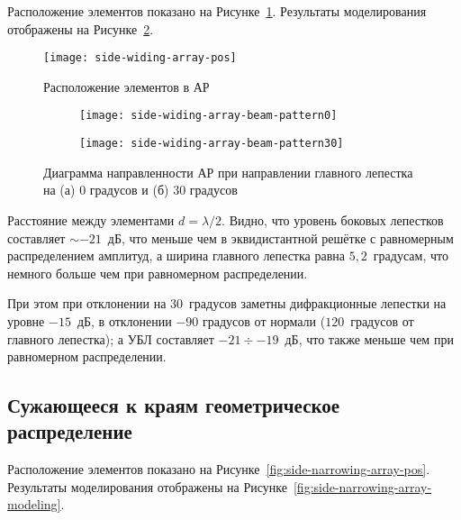 Расположение элементов показано на Рисунке~\ref{fig:side-widing-array-pos}. Результаты моделирования отображены на Рисунке~\ref{fig:side-widing-array-modeling}.

\begin{figure}[!ht]
    \centering
    \texttt{[image: side-widing-array-pos]}
    \caption{Расположение элементов в АР}
    \label{fig:side-widing-array-pos}
\end{figure}


\begin{figure}[!ht]
    \centering
    \begin{subfigure}[b]{0.49\textwidth}
        \centering
        \hspace*{-3ex}
        \texttt{[image: side-widing-array-beam-pattern0]}
        \caption{}%
    \end{subfigure}
    \hfill
    \begin{subfigure}[b]{0.49\textwidth}
        \centering
        \hspace*{-3ex}
        \texttt{[image: side-widing-array-beam-pattern30]}
        \caption{}%
    \end{subfigure}
    \caption{%
    Диаграмма направленности АР при направлении главного лепестка на (а) 0 градусов и (б) 30 градусов
    }%
    \label{fig:side-widing-array-modeling}
\end{figure}

Расстояние между элементами $d=\lambda/2$. Видно, что уровень боковых лепестков составляет $\sim-21$~дБ, 
что меньше чем в эквидистантной решётке с равномерным распределением амплитуд, 
а ширина главного лепестка равна $5,2$~градусам, 
что немного больше чем при равномерном распределении.

При этом при отклонении на $30$~градусов заметны дифракционные лепестки на уровне $-15$~дБ, в отклонении $-90$ градусов от нормали ($120$~градусов от главного лепестка); а УБЛ составляет $-21 \div -19$~дБ, что также меньше чем при равномерном распределении.

\subsection{Сужающееся к краям геометрическое распределение}

Расположение элементов показано на Рисунке~\ref{fig:side-narrowing-array-pos}. Результаты моделирования отображены на Рисунке~\ref{fig:side-narrowing-array-modeling}.

